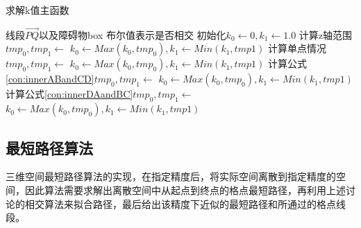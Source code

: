\begin{algorithm}[!htb]
    \caption{求解k值主函数}
    \label{alg::check_insect_main}
    \begin{algorithmic}[1]
        \Require 线段$\vec{PQ}$以及障碍物box
        \Ensure 布尔值表示是否相交
            \State 初始化$k_0\gets0,k_1\gets1.0$
            \State 计算z轴范围$tmp_0,tmp_1 \gets$
            \State $k_0\gets Max(k_0,tmp_0),k_1\gets Min(k_1,tmp1)$
            \State 计算单点情况$tmp_0,tmp_1 \gets$
            \State $k_0\gets Max(k_0,tmp_0),k_1\gets Min(k_1,tmp1)$
            \State 计算公式\ref{con:innerABandCD}$tmp_0,tmp_1 \gets$
            \State $k_0\gets Max(k_0,tmp_0),k_1\gets Min(k_1,tmp1)$
            \State 计算公式\ref{con:innerDAandBC}$tmp_0,tmp_1 \gets$
            \State $k_0\gets Max(k_0,tmp_0),k_1\gets Min(k_1,tmp1)$
                \State {}
            \Else
                \State {}
            \EndIf
        \EndFunction
    \end{algorithmic}
\end{algorithm}

\subsection{最短路径算法}
\par 三维空间最短路径算法的实现，在指定精度后，将实际空间离散到指定精度的空间，因此算法需要求解出离散空间中从起点到终点的格点最短路径，再利用上述讨论的相交算法来拟合路径，最后给出该精度下近似的最短路径和所通过的格点线段。

\FloatBarrier
